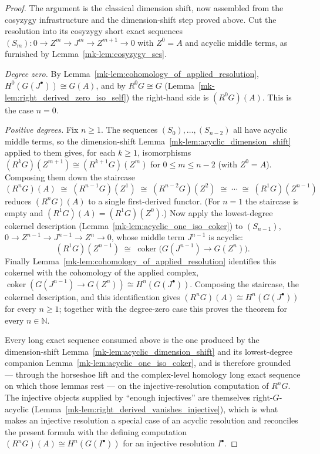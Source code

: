 \begin{proof}
  \leanok
    The argument is the classical dimension shift, now assembled from the cosyzygy
  infrastructure and the dimension-shift step proved above. Cut the resolution into
  its cosyzygy short exact sequences \((S_m) : 0 \to Z^m \to J^m \to Z^{m+1} \to 0\)
  with \(Z^0 = A\) and acyclic middle terms, as furnished by
  Lemma~\ref{mk-lem:cosyzygy_ses}.

  \emph{Degree zero.} By Lemma~\ref{mk-lem:cohomology_of_applied_resolution},
  \(H^0(G(J^\bullet)) \cong G(A)\), and by \(R^0 G \cong G\)
  (Lemma~\ref{mk-lem:right_derived_zero_iso_self}) the right-hand side is \((R^0 G)(A)\).
  This is the case \(n = 0\).

  \emph{Positive degrees.} Fix \(n \geq 1\). The sequences
  \((S_0), \ldots, (S_{n-2})\) all have acyclic middle terms, so the dimension-shift
  Lemma~\ref{mk-lem:acyclic_dimension_shift} applied to them gives, for each \(k \geq 1\),
  isomorphisms \((R^k G)(Z^{m+1}) \cong (R^{k+1} G)(Z^m)\) for \(0 \le m \le n-2\)
  (with \(Z^0 = A\)). Composing them down the staircase
  \[
    (R^n G)(A)
      \;\cong\; (R^{n-1} G)(Z^1)
      \;\cong\; (R^{n-2} G)(Z^2)
      \;\cong\; \cdots
      \;\cong\; (R^{1} G)(Z^{n-1})
  \]
  reduces \((R^n G)(A)\) to a single first-derived functor. (For \(n = 1\) the
  staircase is empty and \((R^1 G)(A) = (R^1 G)(Z^0)\).) Now apply the lowest-degree
  cokernel description (Lemma~\ref{mk-lem:acyclic_one_iso_coker}) to \((S_{n-1})\),
  \(0 \to Z^{n-1} \to J^{n-1} \to Z^n \to 0\), whose middle term \(J^{n-1}\) is
  acyclic:
  \[
    (R^1 G)(Z^{n-1}) \;\cong\; \operatorname{coker}\bigl(G(J^{n-1}) \to G(Z^n)\bigr).
  \]
  Finally Lemma~\ref{mk-lem:cohomology_of_applied_resolution} identifies this cokernel
  with the cohomology of the applied complex,
  \(\operatorname{coker}(G(J^{n-1}) \to G(Z^n)) \cong H^n(G(J^\bullet))\). Composing
  the staircase, the cokernel description, and this identification gives
  \((R^n G)(A) \cong H^n(G(J^\bullet))\) for every \(n \geq 1\); together with the
  degree-zero case this proves the theorem for every \(n \in \mathbb{N}\).

  Every long exact sequence consumed above is the one produced by the dimension-shift
  Lemma~\ref{mk-lem:acyclic_dimension_shift} and its lowest-degree companion
  Lemma~\ref{mk-lem:acyclic_one_iso_coker}, and is therefore grounded --- through the
  horseshoe lift and the complex-level homology long exact sequence on which those
  lemmas rest --- on the injective-resolution computation of \(R^n G\). The injective
  objects supplied by ``enough injectives'' are themselves right-\(G\)-acyclic
  (Lemma~\ref{mk-lem:right_derived_vanishes_injective}), which is what makes an injective
  resolution a special case of an acyclic resolution and reconciles the present
  formula with the defining computation \((R^n G)(A) \cong H^n(G(I^\bullet))\) for an
  injective resolution \(I^\bullet\).
\end{proof}
